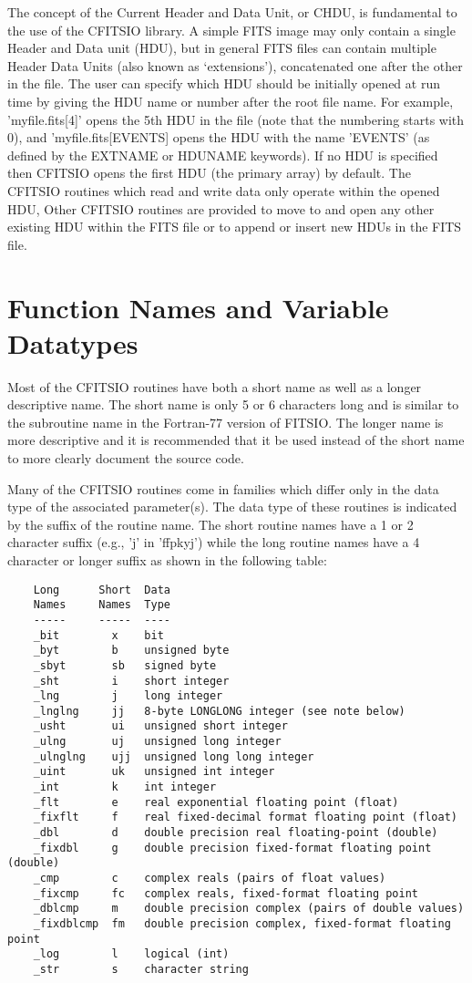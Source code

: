 \documentclass[11pt]{book}
\begin{document}
The concept of the Current Header and Data Unit, or CHDU, is
fundamental to the use of the CFITSIO library.  A simple FITS image may
only contain a single Header and Data unit (HDU), but in general FITS
files can contain multiple Header Data Units (also known as
`extensions'), concatenated one after the other in the file.  The user
can specify which HDU should be initially opened at run time by giving
the HDU name or number after the root file name.  For example,
'myfile.fits[4]' opens the 5th HDU in the file (note that the numbering
starts with 0), and 'myfile.fits[EVENTS] opens the HDU with the name
'EVENTS' (as defined by the EXTNAME or HDUNAME keywords).  If no HDU is
specified then CFITSIO opens the first HDU (the primary array) by
default.  The CFITSIO routines which read and write data  only operate
within the opened HDU,  Other CFITSIO routines are provided to move to
and open any other existing HDU within the FITS file or to append or
insert new HDUs in the FITS file.


\section{Function Names and Variable Datatypes}

Most of the CFITSIO routines have both a short name as well as a
longer descriptive name.  The short name is only 5 or 6 characters long
and is similar to the subroutine name in the Fortran-77 version of
FITSIO.  The longer name is more descriptive and it is recommended that
it be used instead of the short name to more clearly document the
source code.

Many of the CFITSIO routines come in families which differ only in the
data type of the associated parameter(s).  The data type of these
routines is indicated by the suffix of the routine name.  The short
routine names have a 1 or 2 character suffix (e.g., 'j' in 'ffpkyj')
while the long routine names have a 4 character or longer suffix
as shown in the following table:

\begin{verbatim}
    Long      Short  Data
    Names     Names  Type
    -----     -----  ----
    _bit        x    bit
    _byt        b    unsigned byte
    _sbyt       sb   signed byte
    _sht        i    short integer
    _lng        j    long integer
    _lnglng     jj   8-byte LONGLONG integer (see note below)
    _usht       ui   unsigned short integer
    _ulng       uj   unsigned long integer
    _ulnglng    ujj  unsigned long long integer
    _uint       uk   unsigned int integer
    _int        k    int integer
    _flt        e    real exponential floating point (float)
    _fixflt     f    real fixed-decimal format floating point (float)
    _dbl        d    double precision real floating-point (double)
    _fixdbl     g    double precision fixed-format floating point (double)
    _cmp        c    complex reals (pairs of float values)
    _fixcmp     fc   complex reals, fixed-format floating point
    _dblcmp     m    double precision complex (pairs of double values)
    _fixdblcmp  fm   double precision complex, fixed-format floating point
    _log        l    logical (int)
    _str        s    character string
\end{verbatim}
\end{document}
